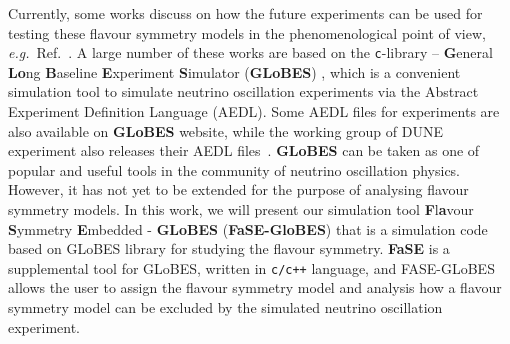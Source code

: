 \documentclass[aps,prd,nofootinbib,preprint]{revtex4}
\begin{document}
Currently, some works discuss on how the future experiments can be used for testing these flavour symmetry models in the phenomenological point of view, \textit{e.g.}~Ref.~\cite{Ballett:2016yod,Chatterjee:2017xkb,Ding:2019zhn,Tang:2019edw}. A large number of these works are based on the \texttt{c}-library -- \textbf{G}eneral \textbf{Lo}ng \textbf{B}aseline \textbf{E}xperiment \textbf{S}imulator (\textbf{GLoBES}) \cite{Huber:2004ka,Huber:2007ji}, which is a convenient simulation tool to simulate neutrino oscillation experiments via the Abstract Experiment Definition Language (AEDL). Some AEDL files for experiments are also available on \textbf{GLoBES} website, while the working group of DUNE experiment also releases their AEDL files~\cite{Alion:2016uaj}.  \textbf{GLoBES} can be taken as one of popular and useful tools in the community of neutrino oscillation physics. However, it has not yet to be extended for the purpose of analysing flavour symmetry models.  In this work, we will present our simulation tool \textbf{F}l\textbf{a}vour \textbf{S}ymmetry \textbf{E}mbedded - \textbf{GLoBES} (\textbf{FaSE-GloBES}) that is a simulation code based on GLoBES library for studying the flavour symmetry. \textbf{FaSE} is a supplemental tool for GLoBES, written in \texttt{c/c++} language, and FASE-GLoBES allows the user to assign the flavour symmetry model and analysis how a flavour symmetry model can be excluded by the simulated neutrino oscillation experiment.


\end{document}
